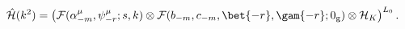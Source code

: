\begin{equation}
%
\hat{\cal H}(k^2) =
\left(
{\cal F}(\alpha^{\mu}_{-m}, \psi^{\mu}_{-r}; s, k) \otimes {\cal F}(b_{-m}, c_{-m}, \bet{-r}, \gam{-r}; 0_{\rm g})
\otimes {\cal H}_{K}
\right)^{L_0}.
%
\end{equation}

